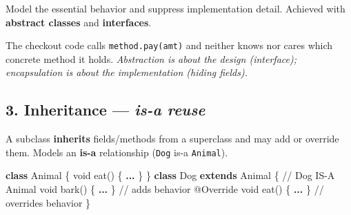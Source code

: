\documentclass[11pt]{article}
\newenvironment{Shaded}{\begin{snugshade}}{\end{snugshade}}
\newcommand{\AttributeTok}[1]{\textcolor[rgb]{0.16,0.50,0.73}{#1}}
\newcommand{\BuiltInTok}[1]{\textcolor[rgb]{0.50,0.55,0.55}{#1}}
\newcommand{\CommentTok}[1]{\textcolor[rgb]{0.48,0.49,0.49}{#1}}
\newcommand{\DataTypeTok}[1]{\textcolor[rgb]{0.16,0.50,0.73}{#1}}
\newcommand{\FunctionTok}[1]{\textcolor[rgb]{0.56,0.27,0.68}{#1}}
\newcommand{\ImportTok}[1]{\textcolor[rgb]{0.15,0.68,0.38}{#1}}
\newcommand{\KeywordTok}[1]{\textcolor[rgb]{0.81,0.81,0.76}{\textbf{#1}}}
\newcommand{\NormalTok}[1]{\textcolor[rgb]{0.81,0.81,0.76}{#1}}
\newcommand{\OperatorTok}[1]{\textcolor[rgb]{0.81,0.81,0.76}{#1}}
\newcommand{\SpecialCharTok}[1]{\textcolor[rgb]{0.24,0.68,0.91}{#1}}
\newcommand{\SpecialStringTok}[1]{\textcolor[rgb]{0.85,0.27,0.33}{#1}}
\newcommand{\VariableTok}[1]{\textcolor[rgb]{0.15,0.68,0.68}{#1}}
\begin{document}
Model the essential behavior and suppress implementation detail. Achieved with \textbf{abstract classes} and \textbf{interfaces}.


\begin{Shaded}
\end{Shaded}

The checkout code calls \texttt{method.pay(amt)} and neither knows nor cares which concrete method it holds. \emph{Abstraction is about the design (interface); encapsulation is about the implementation (hiding fields).}

\subsection{\texorpdfstring{3. Inheritance --- \emph{is-a reuse}}{3. Inheritance --- is-a reuse}}\label{3-inheritance--is-a-reuse}

A subclass \textbf{inherits} fields/methods from a superclass and may add or override them. Models an \textbf{is-a} relationship (\texttt{Dog} is-a \texttt{Animal}).


\begin{Shaded}
\begin{Highlighting}[]
\KeywordTok{class}\NormalTok{ Animal }\OperatorTok{\{} \DataTypeTok{void} \FunctionTok{eat}\OperatorTok{()} \OperatorTok{\{} \KeywordTok{...} \OperatorTok{\}} \OperatorTok{\}}
\KeywordTok{class}\NormalTok{ Dog }\KeywordTok{extends}\NormalTok{ Animal }\OperatorTok{\{}          \CommentTok{// Dog IS{-}A Animal}
    \DataTypeTok{void} \FunctionTok{bark}\OperatorTok{()} \OperatorTok{\{} \KeywordTok{...} \OperatorTok{\}}             \CommentTok{// adds behavior}
    \AttributeTok{@Override} \DataTypeTok{void} \FunctionTok{eat}\OperatorTok{()} \OperatorTok{\{} \KeywordTok{...} \OperatorTok{\}}    \CommentTok{// overrides behavior}
\OperatorTok{\}}
\end{Highlighting}
\end{Shaded}
\end{document}
